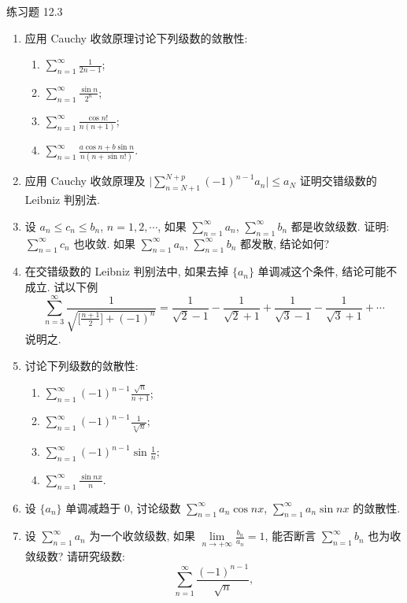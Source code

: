 \begin{exblock}{练习题 12.3}
\begin{enumerate}
  \item 应用 Cauchy 收敛原理讨论下列级数的敛散性:
  \begin{enumerate}
    \item $\displaystyle\sum_{n=1}^{\infty}\frac{1}{2n-1}$;
    \item $\displaystyle\sum_{n=1}^{\infty}\frac{\sin n}{2^{n}}$;
    \item $\displaystyle\sum_{n=1}^{\infty}\frac{\cos n!}{n(n+1)}$;
    \item $\displaystyle\sum_{n=1}^{\infty}\frac{a\cos n+b\sin n}{n(n+\sin n!)}$.
  \end{enumerate}
  \item 应用 Cauchy 收敛原理及 $\bigl|\sum_{n=N+1}^{N+p}(-1)^{n-1}a_{n}\bigr|\leqslant a_{N}$ 证明交错级数的 Leibniz 判别法.
  \item 设 $a_{n}\leqslant c_{n}\leqslant b_{n}$, $n=1,2,\cdots$, 如果 $\sum_{n=1}^{\infty}a_{n}$, $\sum_{n=1}^{\infty}b_{n}$ 都是收敛级数. 证明: $\sum_{n=1}^{\infty}c_{n}$ 也收敛. 如果 $\sum_{n=1}^{\infty}a_{n}$, $\sum_{n=1}^{\infty}b_{n}$ 都发散, 结论如何?
  \item 在交错级数的 Leibniz 判别法中, 如果去掉 $\{a_{n}\}$ 单调减这个条件, 结论可能不成立. 试以下例
  \[
    \sum_{n=3}^{\infty}\frac{1}{\sqrt{\bigl[\frac{n+1}{2}\bigr]+(-1)^{n}}}
    =\frac{1}{\sqrt{2}-1}-\frac{1}{\sqrt{2}+1}
    +\frac{1}{\sqrt{3}-1}-\frac{1}{\sqrt{3}+1}+\cdots
\]
  说明之.
  \item 讨论下列级数的敛散性:
  \begin{enumerate}
    \item $\displaystyle\sum_{n=1}^{\infty}(-1)^{n-1}\frac{\sqrt{n}}{n+1}$;
    \item $\displaystyle\sum_{n=1}^{\infty}(-1)^{n-1}\frac{1}{\sqrt[n]{n}}$;
    \item $\displaystyle\sum_{n=1}^{\infty}(-1)^{n-1}\sin\frac{1}{n}$;
    \item $\displaystyle\sum_{n=1}^{\infty}\frac{\sin nx}{n}$.
  \end{enumerate}
  \item 设 $\{a_{n}\}$ 单调减趋于 $0$, 讨论级数 $\sum_{n=1}^{\infty}a_{n}\cos nx$, $\sum_{n=1}^{\infty}a_{n}\sin nx$ 的敛散性.
  \item 设 $\sum_{n=1}^{\infty}a_{n}$ 为一个收敛级数, 如果 $\lim\limits_{n\to+\infty}\frac{b_{n}}{a_{n}}=1$, 能否断言 $\sum_{n=1}^{\infty}b_{n}$ 也为收敛级数? 请研究级数:
  \[
    \sum_{n=1}^{\infty}\frac{(-1)^{n-1}}{\sqrt{n}},
\]
\end{enumerate}
\end{exblock}

